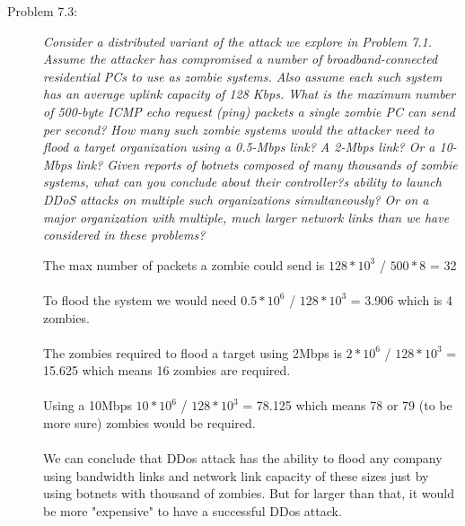 \documentclass[12pt]{article}
\begin{document}
\begin{description}
\item[Problem 7.3:] {\color{grey}\textit{Consider a distributed variant of the attack we explore in Problem 7.1. Assume the attacker has compromised a number of broadband-connected residential PCs to use as zombie systems. Also assume each such system has an average uplink capacity of 128 Kbps. What is the maximum number of 500-byte ICMP echo request (ping) packets a single zombie PC can send per second? How many such zombie systems would the attacker need to flood a target organization using a 0.5-Mbps link? A 2-Mbps link? Or a 10-Mbps link? Given reports of botnets composed of many thousands of zombie systems, what can you conclude about their controller?s ability to launch DDoS attacks on multiple such organizations simultaneously? Or on a major organization with multiple, much larger network links than we have considered in these problems?}} \par
The max number of packets a zombie could send is $128*10^3$ / $500*8$  = 32\\\\To flood the system we would need $0.5*10^6$ / $128*10^3$ = 3.906 which is 4 zombies. \\ \\The zombies required to flood a target using 2Mbps is $2*10^6$ / $128*10^3$ = 15.625 which means 16 zombies are required. \\ \\ Using a 10Mbps $10*10^6$ / $128*10^3$ = 78.125 which means 78 or 79 (to be more sure) zombies would be required. \\ \\We can conclude that DDos attack has the ability to flood any company using bandwidth links and network link capacity of these sizes just by using botnets with thousand of zombies. But for larger than that, it would be more "expensive" to have a successful DDos attack.\\ \par


\end{description}
\end{document}
